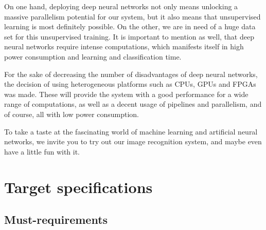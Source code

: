 \documentclass[parskip=full]{scrartcl}
\begin{document}
On one hand, deploying deep neural networks not only means unlocking a massive parallelism potential for our system, but it also means that unsupervised learning is most definitely possible. On the other, we are in need of a huge data set for this unsupervised training. It is important to mention as well, that deep neural networks require intense computations, which manifests itself in high power consumption and learning and classification time.

For the sake of decreasing the number of disadvantages of deep neural networks, the decision of using heterogeneous platforms such as CPUs, GPUs and FPGAs was made. These will provide the system with a good performance for a wide range of computations, as well as a decent usage of pipelines and parallelism, and of course, all with low power consumption.

To take a taste at the fascinating world of machine learning and artificial neural networks, we invite you to try out our image recognition system, and maybe even have a little fun with it.

\pagebreak





\section{Target specifications}

\subsection{Must-requirements}
\end{document}
